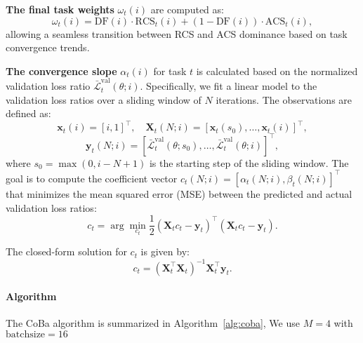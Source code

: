 \textbf{The final task weights} $\omega_t(i)$ are computed as:
\begin{equation}
\label{eq:cobaw}
\omega_t(i) = \text{DF}(i) \cdot \text{RCS}_t(i) + (1 - \text{DF}(i)) \cdot \text{ACS}_t(i),
\end{equation}
allowing a seamless transition between RCS and ACS dominance based on task convergence trends.


\textbf{The convergence slope} $\alpha_t(i)$ for task $t$ is calculated based on the normalized validation loss ratio $\bar{\mathcal{L}}_t^{\text{val}}(\theta; i)$. Specifically, we fit a linear model to the validation loss ratios over a sliding window of $N$ iterations. The observations are defined as:
\begin{equation}
\mathbf{x}_t(i) = [i, 1]^\top, \quad \mathbf{X}_t(N; i) = [\mathbf{x}_t(s_0), \dots, \mathbf{x}_t(i)]^\top,
\end{equation}
\begin{equation}
\mathbf{y}_t(N; i) = [\bar{\mathcal{L}}_t^{\text{val}}(\theta; s_0), \dots, \bar{\mathcal{L}}_t^{\text{val}}(\theta; i)]^\top,
\end{equation}
where $s_0 = \max(0, i - N + 1)$ is the starting step of the sliding window. The goal is to compute the coefficient vector $c_t(N; i) = [\alpha_t(N; i), \beta_t(N; i)]^\top$ that minimizes the mean squared error (MSE) between the predicted and actual validation loss ratios:
\begin{equation}
c_t = \arg \min_{c_t} \frac{1}{2} (\mathbf{X}_t c_t - \mathbf{y}_t)^\top (\mathbf{X}_t c_t - \mathbf{y}_t).
\end{equation}

The closed-form solution for $c_t$ is given by:
\begin{equation}
c_t = (\mathbf{X}_t^\top \mathbf{X}_t)^{-1} \mathbf{X}_t^\top \mathbf{y}_t.
\end{equation}


\paragraph{Algorithm}
The CoBa algorithm is summarized in Algorithm~\ref{alg:coba}, We use $M = 4$ with $\text{batchsize}=16$

